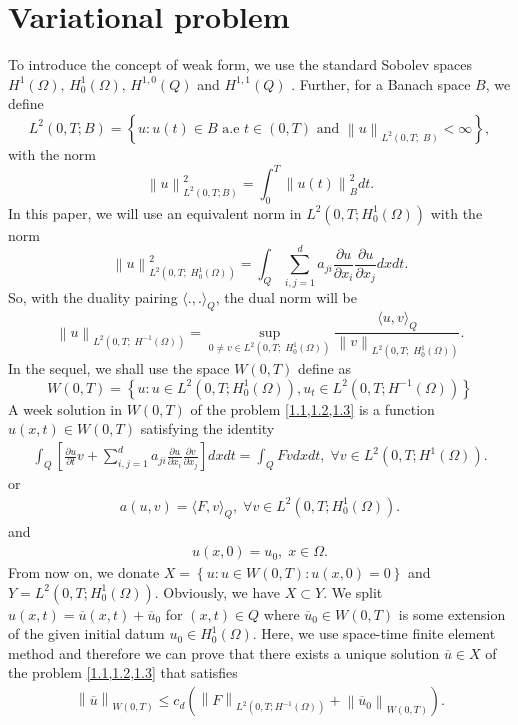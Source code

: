 \documentclass[]{article}
\begin{document}
\section{Variational problem}\label{section2}
To introduce the concept of weak form, we use the standard Sobolev spaces $H^1(\Omega),\, H^1_0(\Omega),\, H^{1, 0}(Q)$ and $H^{1, 1}(Q)$ \cite{b1, b2, b3}. Further, for a Banach space $B$, we define
$$L^2(0, T; B)=\left\{u:u(t)\in B \text{ a.e } t\in (0, T) \text{ and } \left\|u\right\|_{L^2(0, T;\; B)} <\infty \right\},$$
with the norm
$$\left\|u\right\|_{L^2(0, T; B)}^2=\int_0^T\left\|u(t)\right\|^2_Bdt.$$
In this paper, we will use an equivalent norm in $L^2\left(0, T; H^1_0(\Omega)\right)$ with the norm
$$\left\|u\right\|_{L^2(0, T;\; H^1_0(\Omega))}^2=\int_Q \sum_{i, j=1}^{d}a_{ji}\frac{\partial u}{\partial x_i}\frac{\partial u}{\partial x_j}dxdt.$$
So, with the duality pairing $\langle ., .\rangle_Q$, the dual norm will be
$$\left\|u\right\|_{L^2(0, T;\; H^{-1}(\Omega))}=\sup_{0\neq v\in L^2(0, T;\; H^1_0(\Omega))}\frac{\langle u, v\rangle_Q}{\left\|v\right\|_{L^2(0, T;\; H^1_0(\Omega))}}.$$
In the sequel, we shall use the space $W(0, T)$ define as
$$W(0, T)=\left\{u: u\in L^2(0, T; H^1_0(\Omega)), u_t\in L^2\left(0, T; H^{-1}(\Omega) \right)\right\}$$
A week solution in $W(0, T)$ of the problem \cref{1.1,1.2,1.3} is a function $u(x, t)\in W(0, T)$ satisfying the identity
\begin{align}\label{2.1}
	\int_{Q}\left[\frac{\partial u}{\partial t}v+\sum_{i, j=1}^{d}a_{ji}\frac{\partial u}{\partial x_i}\frac{\partial v}{\partial x_j}\right]dxdt=\int_{Q}Fvdxdt,\;\forall v \in L^2\left(0, T; H^1(\Omega)\right).
\end{align}
or 
\begin{align*}
	a(u, v)=\langle F, v\rangle_{Q},\;\forall v \in L^2\left(0, T; H^1_0(\Omega)\right).
\end{align*}
and 
\begin{align}\label{2.2}
	u(x, 0)=u_0,\; x\in \Omega.
\end{align}
From now on, we donate $X=\left\{u: u\in W(0, T): u(x, 0)=0\right\}$ and $Y=L^2\left(0, T; H^1_0(\Omega)\right)$. Obviously, we have $X\subset Y$. We split $u(x, t)=\overline{u}(x, t)+\overline{u}_0$ for $(x, t)\in Q$ where $\overline{u}_0\in W(0, T)$ is some extension of the given initial datum $u_0\in H^1_0(\Omega)$. Here, we use space-time finite element method \cite{a16} and therefore we can prove that there exists a unique solution $\overline{u}\in X$ of the problem \cref{1.1,1.2,1.3} that satisfies 
\begin{align}\label{2.3}
	\left\|\overline{u}\right\|_{W(0, T)} \leq c_d \left(\left\|F\right\|_{L^2\left(0, T; H^{-1}(\Omega)\right)}+\left\|\overline{u}_0\right\|_{W(0, T)}\right).
\end{align}
\end{document}
